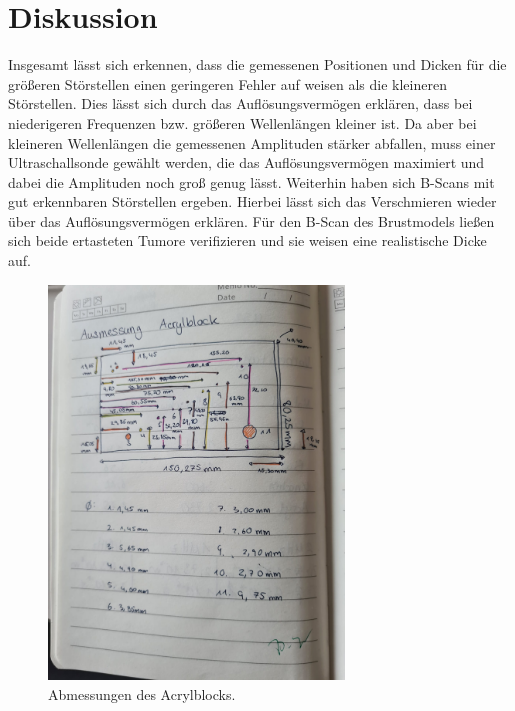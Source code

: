 \section{Diskussion}
\label{sec:Diskussion}
Insgesamt lässt sich erkennen, dass die gemessenen Positionen und Dicken für die größeren Störstellen einen
geringeren Fehler auf weisen als die kleineren Störstellen. Dies lässt sich durch das Auflösungsvermögen
erklären, dass bei niederigeren Frequenzen bzw. größeren Wellenlängen kleiner ist. Da aber bei kleineren
Wellenlängen die gemessenen Amplituden stärker abfallen, muss einer Ultraschallsonde gewählt werden, die
das Auflösungsvermögen maximiert und dabei die Amplituden noch groß genug lässt. Weiterhin haben sich B-Scans
mit gut erkennbaren Störstellen ergeben. Hierbei lässt sich das Verschmieren wieder über das Auflösungsvermögen
erklären. Für den B-Scan des Brustmodels ließen sich beide ertasteten Tumore verifizieren und sie weisen eine
realistische Dicke auf.

\label{sec:Anhang}
\begin{figure}
    \centering
    \includegraphics[width=0.7\textwidth]{messwerte/index.jpg}
    \caption{Abmessungen des Acrylblocks.}
\end{figure}

